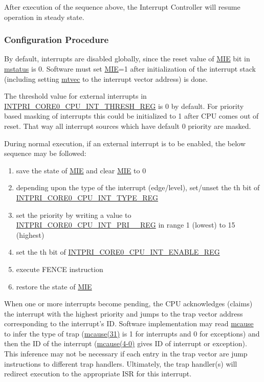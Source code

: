 \documentclass[main\_\_EN.tex]{subfiles}
\begin{document}
After execution of the sequence above, the Interrupt Controller will resume operation in steady state.

\subsubsection{Configuration Procedure}
\label{sec:riscvcpu-int-config}

By default, interrupts are disabled globally, since the reset value of \hyperref[fielddesc:MSTATUSMIE]{MIE} bit in \hyperref[regdesc:MSTATUS]{mstatus} is 0. Software must set \hyperref[fielddesc:MSTATUSMIE]{MIE}=1 after initialization of the interrupt stack (including setting \hyperref[regdesc:MTVEC]{mtvec} to the interrupt vector address) is done.

The threshold value for external interrupts in \hyperref[regdesc:INTPRICORE0CPUINTTHRESHREG]{INTPRI\_CORE0\_CPU\_INT\_THRESH\_REG} is 0 by default. For priority based masking of interrupts this could be initialized to 1 after CPU comes out of reset. That way all interrupt sources which have default 0 priority are masked.

During normal execution, if an external interrupt  is to be enabled, the below sequence may be followed:
\begin{enumerate}
    \item save the state of \hyperref[fielddesc:MSTATUSMIE]{MIE} and clear \hyperref[fielddesc:MSTATUSMIE]{MIE} to 0
    \item depending upon the type of the interrupt (edge/level), set/unset the th bit of \hyperref[regdesc:INTPRICORE0CPUINTTYPEREG]{INTPRI\_CORE0\_CPU\_INT\_TYPE\_REG}
    \item set the priority by writing a value to \hyperref[regdesc:INTPRICORE0CPUINTPRINREG]{INTPRI\_CORE0\_CPU\_INT\_PRI\_\_REG} in range 1 (lowest) to 15 (highest)
    \item set the th bit of \hyperref[regdesc:INTPRICORE0CPUINTENABLEREG]{INTPRI\_CORE0\_CPU\_INT\_ENABLE\_REG}
    \item execute FENCE instruction
    \item restore the state of \hyperref[fielddesc:MSTATUSMIE]{MIE}
\end{enumerate}

When one or more interrupts become pending, the CPU acknowledges (claims) the interrupt with the highest priority and jumps to the trap vector address corresponding to the interrupt's ID. Software implementation may read \hyperref[regdesc:MCAUSE]{mcause} to infer the type of trap (\hyperref[fielddesc:MCAUSEINT]{mcause(31)} is 1 for interrupts and 0 for exceptions) and then the ID of the interrupt (\hyperref[fielddesc:MCAUSECODE]{mcause(4-0)} gives ID of interrupt or exception). This inference may not be necessary if each entry in the trap vector are jump instructions to different trap handlers. Ultimately, the trap handler(s) will redirect execution to the appropriate ISR for this interrupt.
\end{document}
